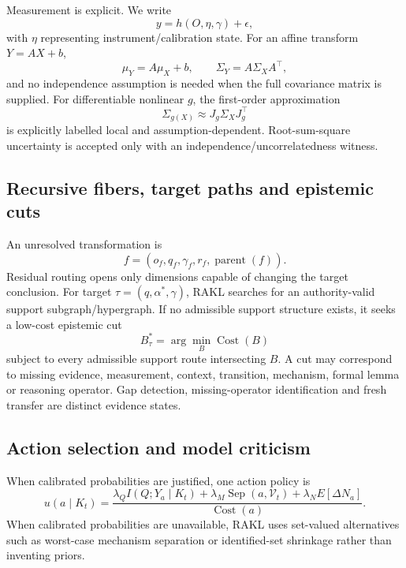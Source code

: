 \documentclass[11pt]{article}
\newcommand{\RAKL}{\textsc{RAKL}}
\begin{document}
Measurement is explicit. We write
\begin{equation}
y=h(O,\eta,\gamma)+\epsilon,
\end{equation}
with $\eta$ representing instrument/calibration state. For an affine transform $Y=AX+b$,
\begin{equation}
\mu_Y=A\mu_X+b,\qquad \Sigma_Y=A\Sigma_XA^\top,
\end{equation}
and no independence assumption is needed when the full covariance matrix is supplied. For differentiable nonlinear $g$, the first-order approximation
\begin{equation}
\Sigma_{g(X)}\approx J_g\Sigma_XJ_g^\top
\end{equation}
is explicitly labelled local and assumption-dependent. Root-sum-square uncertainty is accepted only with an independence/uncorrelatedness witness.

\subsection{Recursive fibers, target paths and epistemic cuts}
An unresolved transformation is
\begin{equation}
f=(o_f,q_f,\gamma_f,r_f,\operatorname{parent}(f)).
\end{equation}
Residual routing opens only dimensions capable of changing the target conclusion. For target $\tau=(q,\alpha^*,\gamma)$, \RAKL{} searches for an authority-valid support subgraph/hypergraph. If no admissible support structure exists, it seeks a low-cost epistemic cut
\begin{equation}
B^*_{\tau}=\arg\min_B\operatorname{Cost}(B)
\end{equation}
subject to every admissible support route intersecting $B$. A cut may correspond to missing evidence, measurement, context, transition, mechanism, formal lemma or reasoning operator. Gap detection, missing-operator identification and fresh transfer are distinct evidence states.

\subsection{Action selection and model criticism}
When calibrated probabilities are justified, one action policy is
\begin{equation}
u(a\mid K_t)=\frac{\lambda_Q I(Q;Y_a\mid K_t)+\lambda_M\operatorname{Sep}(a,\mathcal V_t)+\lambda_N E[\Delta N_a]}{\operatorname{Cost}(a)}.
\end{equation}
When calibrated probabilities are unavailable, \RAKL{} uses set-valued alternatives such as worst-case mechanism separation or identified-set shrinkage rather than inventing priors.
\end{document}

